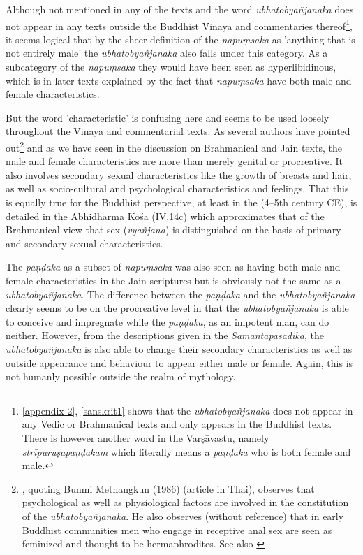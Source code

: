 Although not mentioned in any of the texts and the word {\em ubhatob­yañ­janaka} does not appear in any texts outside the Buddhist Vinaya and commentaries thereof\footnote{\ref{appendix 2}, \ref{sanskrit1} shows that the {\em ubhatob­yañ­janaka} does not appear in any Vedic or Brahmanical texts and only appears in the Buddhist texts. There is however another word in the {\m Varṣāvastu}, namely {\em strīpuruṣapaṇḍakam} which literally means a {\em paṇḍaka} who is both female and male.}, it seems logical that by the sheer definition of the {\em napuṃsaka} as 'anything that is not entirely male' the {\em ubhatob­yañ­janaka} also falls under this category. As a subcategory of the {\em napuṃsaka} they would have been seen as hyperlibidinous, which is in later texts explained by the fact that {\em napuṃsaka} have both male and female characteristics. 

But the word 'characteristic' is confusing here and seems to be used loosely throughout the Vinaya and commentarial texts. As several authors have pointed out\footnote{\cite{jackson}, quoting Bunmi Methangkun (1986) (article in Thai), observes that psychological as well as physiological factors are involved in the constitution of the {\em ubhatob­yañ­janaka}. He also observes (without reference) that in early Buddhist communities men who engage in receptive anal sex are seen as feminized and thought to be hermaphrodites. See also \cite{zwilling}} and as we have seen in the discussion on Brahmanical and Jain texts, the male and female characteristics are more than merely genital or procreative. It also involves secondary sexual characteristics like the growth of breasts and hair, as well as socio-cultural and psychological characteristics and feelings. That this is equally true for the Buddhist perspective, at least in the (4–5th century CE), is detailed in the Abhidharma Kośa (IV.14c) which approximates that of the Brahmanical view that sex ({\em vyañjana}) is distinguished on the basis of primary and secondary sexual characteristics.

The {\em paṇḍaka} as a subset of {\em napuṃsaka} was also seen as having both male and female characteristics in the Jain scriptures but is obviously not the same as a {\em ubhatob­yañ­janaka}. The difference between the {\em paṇḍaka} and the {\em ubhatob­yañ­janaka} clearly seems to be on the procreative level in that the {\em ubhatob­yañ­janaka} is able to conceive and impregnate while the {\em paṇḍaka}, as an impotent man, can do neither. However, from the descriptions given in the {\em Samantapāsādikā}, the {\em ubhatob­yañ­janaka} is also able to change their secondary characteristics as well as outside appearance and behaviour to appear either male or female. Again, this is not humanly possible outside the realm of mythology.

